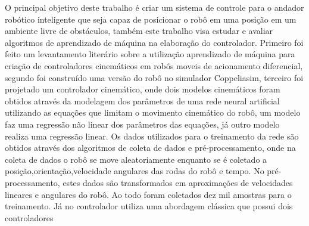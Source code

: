 %
%

O principal objetivo deste trabalho é criar um  sistema de
controle para o andador robótico inteligente que seja capaz de
posicionar o robô em uma posição em um ambiente livre de obstáculos,
também  este trabalho visa estudar e avaliar algoritmos de aprendizado
de máquina na elaboração do controlador. Primeiro foi feito um levantamento
literário sobre a utilização aprendizado de máquina para criação de
controladores cinemáticos em robôs moveis de acionamento diferencial,
segundo foi construído uma versão do robô no simulador Coppeliasim,
terceiro foi projetado um controlador cinemático, onde dois modelos
cinemáticos foram obtidos através da modelagem dos parâmetros de uma
rede neural artificial utilizando as equações que limitam o movimento
cinemático do robô, um modelo faz uma regressão não linear dos
parâmetros das equações, já outro modelo realiza uma regressão linear.
Os dados utilizados para o treinamento da rede são obtidos
através dos algoritmos de coleta de dados e pré-processamento,
onde na coleta de dados o robô se move aleatoriamente enquanto se é
coletado a posição,orientação,velocidade angulares das rodas do robô e
tempo. No pré-processamento, estes dados são transformados em aproximações
de velocidades lineares e angulares do robô. Ao todo foram coletados dez mil
amostras para o treinamento. Já no controlador utiliza uma abordagem
clássica que possui  dois controladores

